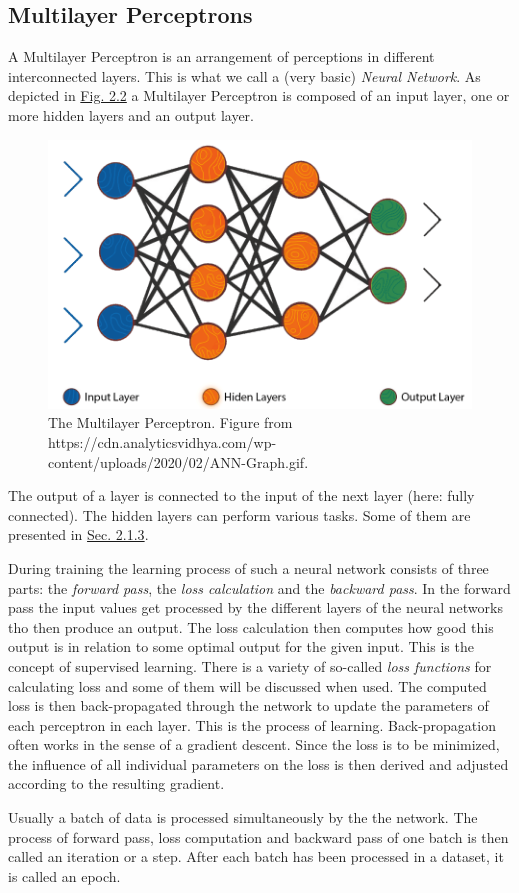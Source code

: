 \subsection{Multilayer Perceptrons} \label{sec:2.1.2}
A Multilayer Perceptron is an arrangement of perceptions in different interconnected layers. This is what we call a (very basic) \textit{Neural Network}. As depicted in \hyperref[fig:2.2]{Fig. 2.2} a Multilayer Perceptron is composed of an input layer, one or more hidden layers and an output layer. 
%
\begin{figure} \label{fig:2.2}
    \centering
    \includegraphics[width=.5\textwidth]{Chapters/figures/multilayer_perceptron.PNG}
    \caption[The Multilayer Perceptron]{The Multilayer Perceptron. Figure from https://cdn.analyticsvidhya.com/wp-content/uploads/2020/02/ANN-Graph.gif.}
\end{figure}
%
The output of a layer is connected to the input of the next layer (here: fully connected). The hidden layers can perform various tasks. Some of them are presented in \hyperref[sec:2.1.3]{Sec. 2.1.3}.

During training the learning process of such a neural network consists of three parts: the \textit{forward pass}, the \textit{loss calculation} and the \textit{backward pass}. In the forward pass the input values get processed by the different layers of the neural networks tho then produce an output. The loss calculation then computes how good this output is in relation to some optimal output for the given input. This is the concept of supervised learning. There is a variety of so-called \textit{loss functions} for calculating loss and some of them will be discussed when used. The computed loss is then back-propagated through the network to update the parameters of each perceptron in each layer. This is the process of learning. Back-propagation often works in the sense of a gradient descent. Since the loss is to be minimized, the influence of all individual parameters on the loss is then derived and adjusted according to the resulting gradient. 

Usually a batch of data is processed simultaneously by the the network. The process of forward pass, loss computation and backward pass of one batch is then called an iteration or a step. After each batch has been processed in a dataset, it is called an epoch.
%
